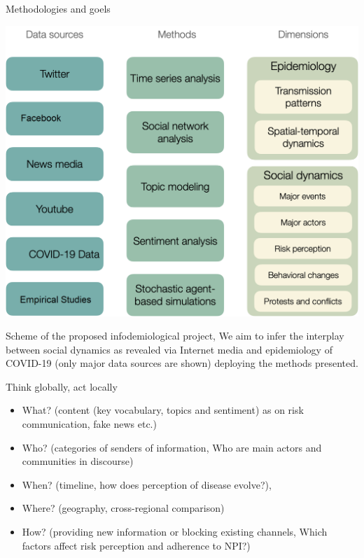 \documentclass[
  10pt,
  ignorenonframetext,
  a4paper,handout]{beamer}
\providecommand{\tightlist}{%
  \setlength{\itemsep}{0pt}\setlength{\parskip}{0pt}}
\begin{document}
\begin{frame}{Methodologies and goels}
\protect\hypertarget{methodologies-and-goels}{}
\begin{center}\includegraphics[width=0.7\linewidth]{scheme} \end{center}

Scheme of the proposed infodemiological project, We aim to infer the
interplay between social dynamics as revealed via Internet media and
epidemiology of COVID-19 (only major data sources are shown) deploying
the methods presented.
\end{frame}

\begin{frame}{Think globally, act locally}
\protect\hypertarget{think-globally-act-locally}{}
\begin{itemize}
\tightlist
\item
  What? (content (key vocabulary, topics and sentiment) as on risk
  communication, fake news etc.)
\item
  Who? (categories of senders of information, Who are main actors and
  communities in discourse)
\item
  When? (timeline, how does perception of disease evolve?),
\item
  Where? (geography, cross-regional comparison)
\item
  How? (providing new information or blocking existing channels, Which
  factors affect risk perception and adherence to NPI?)
\end{itemize}
\end{frame}
\end{document}
